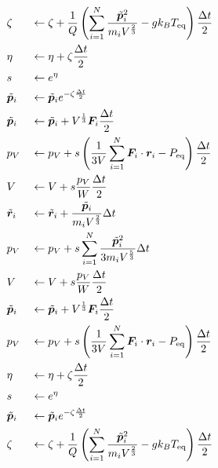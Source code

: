 \begin{alignat}{2}
 & \zeta &&\gets  \zeta  + \frac{1}{Q}
                  \left(
                  \sum_{i=1}^{N} \frac{\Tilde{\bm{p}}_{i}^{2}}{m_{i} V^{\frac{2}{3}}} - g k_{B} T_{\mathrm{eq}}
                  \right) \frac{\Delta t}{2}
 \label{eq:NoseAndersen25.1}
 \\
 & \eta &&\gets \eta  + \zeta \frac{\Delta t}{2}
 \label{eq:NoseAndersen25.2}
 \\
 & s &&\gets e^{\eta}
 \label{eq:NoseAndersen25.3}
 \\
 & \Tilde{\bm{p}}_{i} &&\gets \Tilde{\bm{p}}_{i}  e^{- \zeta \frac{\Delta t}{2}}
 \label{eq:NoseAndersen25.4}
 \\
 & \Tilde{\bm{p}}_{i} &&\gets \Tilde{\bm{p}}_{i}  + V^{\frac{1}{3}} \bm{F}_{i} 
                                  \frac{\Delta t}{2}
 \label{eq:NoseAndersen25.4}
 \\
 & p_{V} &&\gets p_{V}  + s \left( \frac{1}{3V} \sum_{i=1}^{N}
                        \bm{F}_{i} \cdot \bm{r}_{i} - P_{\mathrm{eq}} \right) \frac{\Delta t}{2}
 \label{eq:NoseAndersen25.6}
 \\
 & V &&\gets V + s \frac{p_{V}}{W} \frac{\Delta t}{2}
 \label{eq:NoseAndersen25.7}
 \\
 & \Tilde{\bm{r}}_{i} &&\gets \Tilde{\bm{r}}_{i}
                                + \frac{\Tilde{\bm{p}}_{i}}{m_{i} V^{\frac{2}{3}}} \Delta t
 \label{eq:NoseAndersen25.8}
 \\
 & p_{V} &&\gets p_{V} + s \sum_{i=1}^{N} \frac{\Tilde{\bm{p}}_{i}^{2}}{3 m_{i} V^{\frac{5}{3}}} \Delta t
 \label{eq:NoseAndersen25.9}
 \\
 & V &&\gets V  + s \frac{p_{V}}{W} \frac{\Delta t}{2}
 \label{eq:NoseAndersen25.10}
 \\
 & \Tilde{\bm{p}}_{i} &&\gets \Tilde{\bm{p}}_{i} + V^{\frac{1}{3}} \bm{F}_{i} 
                                  \frac{\Delta t}{2}
 \label{eq:NoseAndersen25.11}
 \\
 & p_{V} &&\gets p_{V} + s \left( \frac{1}{3V} \sum_{i=1}^{N}
                 \bm{F}_{i} \cdot \bm{r}_{i} - P_{\mathrm{eq}} \right) \frac{\Delta t}{2}
 \label{eq:NoseAndersen25.12}
 \\
 & \eta &&\gets \eta  + \zeta \frac{\Delta t}{2}
 \label{eq:NoseAndersen25.13}
 \\
 & s &&\gets e^{\eta}
 \label{eq:NoseAndersen25.14}
 \\
 & \Tilde{\bm{p}}_{i} &&\gets \Tilde{\bm{p}}_{i}  e^{- \zeta \frac{\Delta t}{2}} 
 \label{eq:NoseAndersen25.15}
 \\
 & \zeta &&\gets \zeta  + \frac{1}{Q}
                    \left(
                    \sum_{i=1}^{N} \frac{\Tilde{\bm{p}}_{i}^{2}}{m_{i} V^{\frac{2}{3}}} - g k_{B} T_{\mathrm{eq}}
                    \right) \frac{\Delta t}{2}
 \label{eq:NoseAndersen25.16}
\end{alignat}

